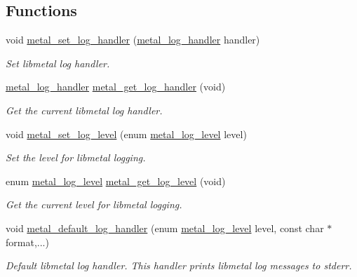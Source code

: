 \subsection*{Functions}
\begin{DoxyCompactItemize}
\item 
void \hyperlink{group__logging_ga68f2f88eeba019ecad0ad0f0cf42d724}{metal\+\_\+set\+\_\+log\+\_\+handler} (\hyperlink{group__logging_gaa79b2a8962227bb67c242b98afda292a}{metal\+\_\+log\+\_\+handler} handler)
\begin{DoxyCompactList}\small\item\em Set libmetal log handler. \end{DoxyCompactList}\item 
\hyperlink{group__logging_gaa79b2a8962227bb67c242b98afda292a}{metal\+\_\+log\+\_\+handler} \hyperlink{group__logging_ga526a951e1d184816fe86d474e71cec42}{metal\+\_\+get\+\_\+log\+\_\+handler} (void)
\begin{DoxyCompactList}\small\item\em Get the current libmetal log handler. \end{DoxyCompactList}\item 
void \hyperlink{group__logging_ga97d10ee76c920dd83b099f4cd1c26c0d}{metal\+\_\+set\+\_\+log\+\_\+level} (enum \hyperlink{group__logging_ga4ffa0f4a1339af510aca7f817ee36d82}{metal\+\_\+log\+\_\+level} level)
\begin{DoxyCompactList}\small\item\em Set the level for libmetal logging. \end{DoxyCompactList}\item 
enum \hyperlink{group__logging_ga4ffa0f4a1339af510aca7f817ee36d82}{metal\+\_\+log\+\_\+level} \hyperlink{group__logging_gaba9eb8e1922ace9eb3ac2a7fa9ff9700}{metal\+\_\+get\+\_\+log\+\_\+level} (void)
\begin{DoxyCompactList}\small\item\em Get the current level for libmetal logging. \end{DoxyCompactList}\item 
void \hyperlink{group__logging_ga02b6dcb78052b93f9f78df2afb0cf464}{metal\+\_\+default\+\_\+log\+\_\+handler} (enum \hyperlink{group__logging_ga4ffa0f4a1339af510aca7f817ee36d82}{metal\+\_\+log\+\_\+level} level, const char $\ast$format,...)
\begin{DoxyCompactList}\small\item\em Default libmetal log handler. This handler prints libmetal log messages to stderr. \end{DoxyCompactList}\end{DoxyCompactItemize}


